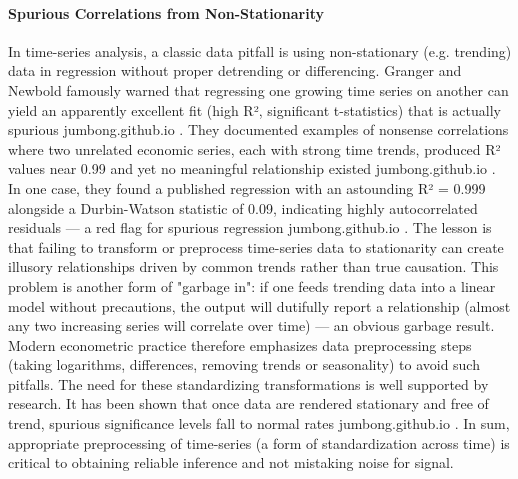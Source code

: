 \documentclass{article}
\begin{document}
\begin{appendices}
\paragraph{Spurious Correlations from Non-Stationarity}
In time-series analysis, a classic data pitfall is using non-stationary (e.g. trending) data in regression without proper detrending or differencing. Granger and Newbold famously warned that regressing one growing time series on another can yield an apparently excellent fit (high R², significant t-statistics) that is actually spurious
jumbong.github.io
. They documented examples of nonsense correlations where two unrelated economic series, each with strong time trends, produced R² values near 0.99 and yet no meaningful relationship existed
jumbong.github.io
. In one case, they found a published regression with an astounding R² = 0.999 alongside a Durbin-Watson statistic of 0.09, indicating highly autocorrelated residuals --- a red flag for spurious regression
jumbong.github.io
. The lesson is that failing to transform or preprocess time-series data to stationarity can create illusory relationships driven by common trends rather than true causation. This problem is another form of "garbage in": if one feeds trending data into a linear model without precautions, the output will dutifully report a relationship (almost any two increasing series will correlate over time) --- an obvious garbage result. Modern econometric practice therefore emphasizes data preprocessing steps (taking logarithms, differences, removing trends or seasonality) to avoid such pitfalls. The need for these standardizing transformations is well supported by research. It has been shown that once data are rendered stationary and free of trend, spurious significance levels fall to normal rates
jumbong.github.io
. In sum, appropriate preprocessing of time-series (a form of standardization across time) is critical to obtaining reliable inference and not mistaking noise for signal.


\end{appendices}
\end{document}
